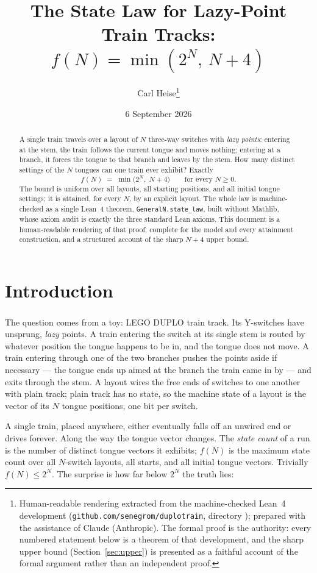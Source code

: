 \documentclass[11pt]{article}
\title{The State Law for Lazy-Point Train Tracks:\\
  $f(N) = \min(2^N,\, N+4)$}
\author{Carl Heise\thanks{Human-readable rendering extracted from the
    machine-checked Lean~4 development
    (\texttt{github.com/senegrom/duplotrain}, directory
    \file{theory/lean}); prepared with the assistance of Claude (Anthropic).
    The formal proof is the authority: every numbered statement below is a
    theorem of that development, and the sharp upper bound
    (Section~\ref{sec:upper}) is presented as a faithful account of the
    formal argument rather than an independent proof.}}
\date{6 September 2026}
\theoremstyle{definition}
\newcommand{\lean}[1]{\texttt{#1}}
\begin{document}
\maketitle

\begin{abstract}
  A single train travels over a layout of $N$ three-way switches
  with \emph{lazy points}: entering at the stem, the train follows the
  current tongue and moves nothing; entering at a branch, it forces the
  tongue to that branch and leaves by the stem.  How many distinct
  settings of the $N$ tongues can one train ever exhibit?  Exactly
  \[ f(N) \;=\; \min\bigl(2^N,\; N+4\bigr) \qquad\text{for every } N \ge 0. \]
  The bound is uniform over all layouts, all starting positions, and all
  initial tongue settings; it is attained, for every $N$, by an explicit
  layout.  The whole law is machine-checked as a single Lean~4 theorem,
  \lean{GeneralN.state\_law}, built without Mathlib, whose axiom audit is
  exactly the three standard Lean axioms.  This document is a
  human-readable rendering of that proof: complete for the model and
  every attainment construction, and a structured
  account of the sharp $N+4$ upper bound.
\end{abstract}

\tableofcontents

\section{Introduction}

The question comes from a toy: LEGO\textsuperscript{\textregistered}
DUPLO\textsuperscript{\textregistered} train track.  Its Y-switches have
unsprung, \emph{lazy} points.  A train entering the switch at its single
stem is routed by whatever position the tongue happens to be in, and the
tongue does not move.  A train entering through one of the two branches
pushes the points aside if necessary --- the tongue ends up aimed at the
branch the train came in by --- and exits through the stem.  A layout wires
the free ends of switches to one another with plain track; plain track has
no state, so the machine state of a layout is the vector of its $N$ tongue
positions, one bit per switch.

A single train, placed anywhere, either eventually falls off an unwired
end or drives forever.  Along the way the tongue vector changes.  The
\emph{state count} of a run is the number of distinct tongue vectors it
exhibits; $f(N)$ is the maximum state count over all $N$-switch layouts,
all starts, and all initial tongue vectors.  Trivially $f(N) \le 2^N$.
The surprise is how far below $2^N$ the truth lies:
\end{document}
